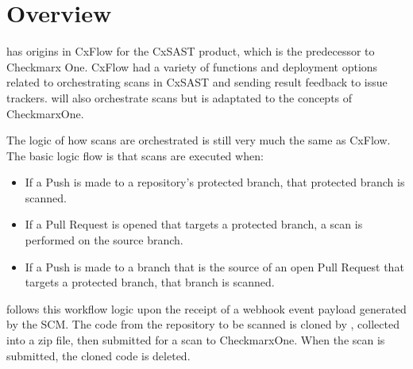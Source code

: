 \chapter{Overview}\label{sec:overview}

\cxoneflow has origins in CxFlow for the CxSAST product, which is the predecessor to Checkmarx One.  CxFlow
had a variety of functions and deployment options related to orchestrating scans in CxSAST and sending
result feedback to issue trackers.  \cxoneflow will also orchestrate scans but is adaptated to the
concepts of CheckmarxOne.

The \cxoneflow logic of how scans are orchestrated is still very much the same as CxFlow.  The basic
logic flow is that scans are executed when:

\begin{itemize}
    \item If a Push is made to a repository's protected branch, that protected branch is scanned.
    \item If a Pull Request is opened that targets a protected branch, a scan is performed on
    the source branch.
    \item If a Push is made to a branch that is the source of an open Pull Request that targets
    a protected branch, that branch is scanned.
\end{itemize}


\cxoneflow follows this workflow logic upon the receipt of a webhook event payload generated by the SCM.
The code from the repository to be scanned is cloned by \cxoneflow, collected into a zip file, then submitted
for a scan to CheckmarxOne.  When the scan is submitted, the cloned code is deleted.

